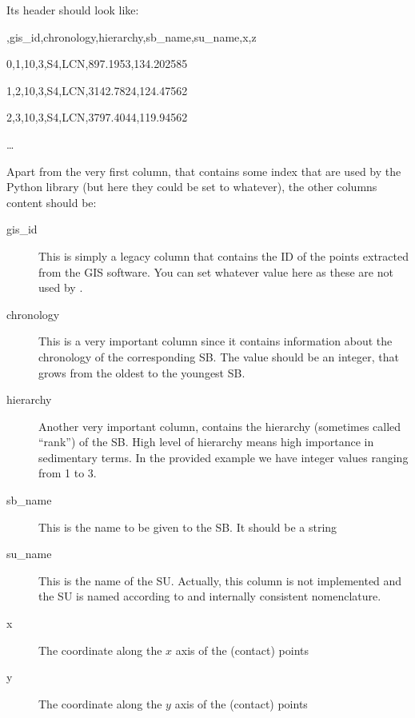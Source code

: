 \documentclass[letterpaper,10pt,english]{sphinxmanual}
\begin{document}
Its header should look like:

\begin{DUlineblock}{0em}
\item[] ,gis\_id,chronology,hierarchy,sb\_name,su\_name,x,z
\item[] 0,1,10,3,S4,LCN,897.1953,134.202585
\item[] 1,2,10,3,S4,LCN,3142.7824,124.47562
\item[] 2,3,10,3,S4,LCN,3797.4044,119.94562
\item[] …
\end{DUlineblock}

Apart from the very first column, that contains some index that are
used by the Python library  (but here they could be set to
whatever), the other columns content should be:
\begin{description}
\item[{gis\_id}] \leavevmode
This is simply a legacy column that contains the ID of the points extracted from the GIS software.
You can set whatever value here as these are not used by .

\item[{chronology}] \leavevmode
This is a very important column since it contains information about the chronology of the corresponding
SB. The value should be an integer, that grows from the oldest to the youngest SB.

\item[{hierarchy}] \leavevmode
Another very important column, contains the hierarchy (sometimes called “rank”) of the SB. High level of hierarchy
means high importance in sedimentary terms. In the provided example we have integer values ranging from 1 to 3.

\item[{sb\_name}] \leavevmode
This is the name to be given to the SB. It should be a string

\item[{su\_name}] \leavevmode
This is the name of the SU. Actually, this column is not implemented and the SU is named according to
and internally consistent nomenclature.

\item[{x}] \leavevmode
The coordinate along the \(x\) axis of the (contact) points

\item[{y}] \leavevmode
The coordinate along the \(y\) axis of the (contact) points

\end{description}
\end{document}
